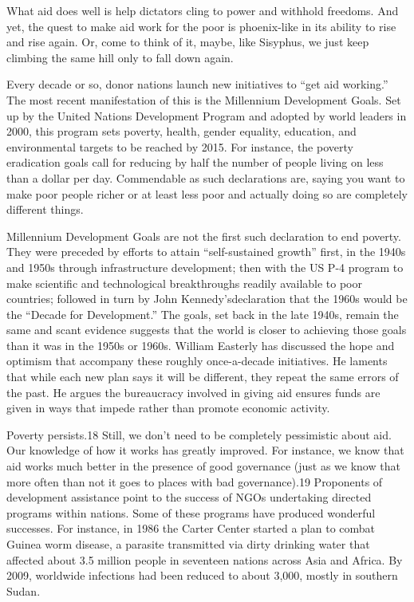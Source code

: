 \documentclass[10pt]{article}
\begin{document}
{\large What aid does well is help dictators cling to power and withhold
freedoms. And yet, the quest to make aid work for the poor is phoenix-like in its
ability to rise and rise again. Or, come to think of it, maybe, like Sisyphus, we
just keep climbing the same hill only to fall down again.}

{\large Every decade or so, donor nations launch new initiatives to ``get aid
working.'' The most recent manifestation of this is the Millennium Development
Goals. Set up by the United Nations Development Program and adopted by world
leaders in 2000, this program sets poverty, health, gender equality, education,
and environmental targets to be reached by 2015. For instance, the poverty
eradication goals call for reducing by half the number of people living on less
than a dollar per day. Commendable as such declarations are, saying you want to
make poor people richer or at least less poor and actually doing so are
completely different things.}

{\large Millennium Development Goals are not the first such declaration to end
poverty. They were preceded by efforts to attain ``self-sustained growth'' first,
in the 1940s and 1950s through infrastructure development; then with the US P-4
program to make scientific and technological breakthroughs readily available to
poor countries; followed in turn by John Kennedy'sdeclaration that the 1960s
would be the ``Decade for Development.'' The goals, set back in the late 1940s,
remain the same and scant evidence suggests that the world is closer to achieving
those goals than it was in the 1950s or 1960s. William Easterly has discussed the
hope and optimism that accompany these roughly once-a-decade initiatives. He
laments that while each new plan says it will be different, they repeat the same
errors of the past. He argues the bureaucracy involved in giving aid ensures
funds are given in ways that impede rather than promote economic activity.}

{\large Poverty persists.18 Still, we don't need to be completely pessimistic
about aid. Our knowledge of how it works has greatly improved. For instance, we
know that aid works much better in the presence of good governance (just as we
know that more often than not it goes to places with bad governance).19
Proponents of development assistance point to the success of NGOs undertaking
directed programs within nations. Some of these programs have produced wonderful
successes. For instance, in 1986 the Carter Center started a plan to combat
Guinea worm disease, a parasite transmitted via dirty drinking water that
affected about 3.5 million people in seventeen nations across Asia and Africa. By
2009, worldwide infections had been reduced to about 3,000, mostly in southern
Sudan.}
\end{document}
